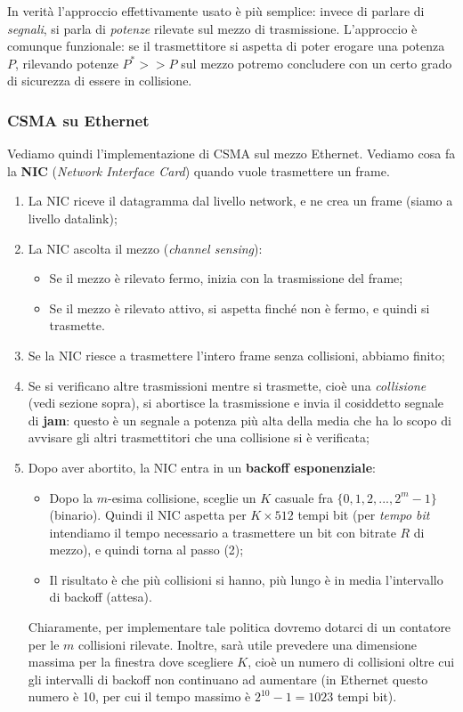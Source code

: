 \documentclass[a4paper,11pt]{article}
\begin{document}
In verità l'approccio effettivamente usato è più semplice: invece di parlare di \textit{segnali}, si parla di \textit{potenze} rilevate sul mezzo di trasmissione. L'approccio è comunque funzionale: se il trasmettitore si aspetta di poter erogare una potenza $P$, rilevando potenze $P^* >> P$ sul mezzo potremo concludere con un certo grado di sicurezza di essere in collisione.

\subsubsection{CSMA su Ethernet}
Vediamo quindi l'implementazione di CSMA sul mezzo Ethernet.
Vediamo cosa fa la \textbf{NIC} (\textit{Network Interface Card}) quando vuole trasmettere un frame.
\begin{enumerate}
	\item La NIC riceve il datagramma dal livello network, e ne crea un frame (siamo a livello datalink);
	\item La NIC ascolta il mezzo (\textit{channel sensing}):
		\begin{itemize}
			\item Se il mezzo è rilevato fermo, inizia con la trasmissione del frame;
			\item Se il mezzo è rilevato attivo, si aspetta finché non è fermo, e quindi si trasmette.
		\end{itemize}
	\item Se la NIC riesce a trasmettere l'intero frame senza collisioni, abbiamo finito;
	\item Se si verificano altre trasmissioni mentre si trasmette, cioè una \textit{collisione} (vedi sezione sopra), si abortisce la trasmissione e invia il cosiddetto segnale di \textbf{jam}: questo è un segnale a potenza più alta della media che ha lo scopo di avvisare gli altri trasmettitori che una collisione si è verificata;
	\item Dopo aver abortito, la NIC entra in un \textbf{backoff esponenziale}:
		\begin{itemize}
			\item Dopo la $m$-esima collisione, sceglie un $K$ casuale fra $\{ 0, 1, 2, ..., 2^m - 1 \}$ (binario). Quindi il NIC aspetta per $K \times 512$ tempi bit (per \textit{tempo bit} intendiamo il tempo necessario a trasmettere un bit con bitrate $R$ di mezzo), e quindi torna al passo (2);
			\item Il risultato è che più collisioni si hanno, più lungo è in media l'intervallo di backoff (attesa). 
		\end{itemize}
	Chiaramente, per implementare tale politica dovremo dotarci di un contatore per le $m$ collisioni rilevate. Inoltre, sarà utile prevedere una dimensione massima per la finestra dove scegliere $K$, cioè un numero di collisioni oltre cui gli intervalli di backoff non continuano ad aumentare (in Ethernet questo numero è 10, per cui il tempo massimo è $2^10 -1 = 1023$ tempi bit).
\end{enumerate}
\end{document}
